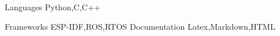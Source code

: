 
\begin{cvskills}
  \cvskill
    {Languages} %
    {Python,C,C++} %

  \cvskill
    {Frameworks} %
    {ESP-IDF,ROS,RTOS} %
  \cvskill
    {Documentation} %
    {Latex,Markdown,HTML} %
\end{cvskills}
